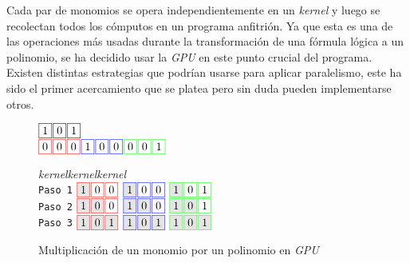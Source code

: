 Cada par de monomios se opera independientemente en un \textit{kernel} y luego se recolectan todos los cómputos en un programa anfitrión. Ya que esta es una de las operaciones más usadas durante la transformación de una fórmula lógica a un polinomio, se ha decidido usar la \textit{GPU} en este punto crucial del programa. Existen distintas estrategias que podrían usarse para aplicar paralelismo, este ha sido el primer acercamiento que se platea pero sin duda pueden implementarse otros.

\begin{figure}
    \centering
    \begin{minipage}[c][4.2cm][b]{.58\textwidth}
    \noindent
    $\fbox{1} \hspace*{.1em} \fbox{0} \hspace*{.1em} \fbox{1}$\\
    \noindent
    $\fcolorbox{red}{white}{0} \sep \fcolorbox{red}{white}{0} \sep \fcolorbox{red}{white}{0} \sep \fcolorbox{blue}{white}{1} \sep \fcolorbox{blue}{white}{0} \sep \fcolorbox{blue}{white}{0} \sep \fcolorbox{green}{white}{0} \sep \fcolorbox{green}{white}{0} \sep \fcolorbox{green}{white}{1}$\\

    \vspace{1em}

    \noindent\hspace{3.6em}\textit{kernel}\hspace{3.4em}\textit{kernel}\hspace{3.4em}\textit{kernel}\\
    \centering
    \texttt{Paso 1}
    $\fcolorbox{red}{gray!20}{1} \sep \fcolorbox{red}{white}{0} \sep \fcolorbox{red}{white}{0}$ \hspace{2em} $\fcolorbox{blue}{gray!20}{1} \sep \fcolorbox{blue}{white}{0} \sep \fcolorbox{blue}{white}{0}$ \hspace{2em} $\fcolorbox{green}{gray!20}{1} \sep \fcolorbox{green}{white}{0} \sep \fcolorbox{green}{white}{1}$\\

    \texttt{Paso 2}
    $\fcolorbox{red}{gray!20}{1} \sep \fcolorbox{red}{gray!20}{0} \sep \fcolorbox{red}{white}{0}$ \hspace{2em} $\fcolorbox{blue}{gray!20}{1} \sep \fcolorbox{blue}{gray!20}{0} \sep \fcolorbox{blue}{white}{0}$ \hspace{2em} $\fcolorbox{green}{gray!20}{1} \sep \fcolorbox{green}{gray!20}{0} \sep \fcolorbox{green}{white}{1}$\\

    \texttt{Paso 3}
    $\fcolorbox{red}{gray!20}{1} \sep \fcolorbox{red}{gray!20}{0} \sep \fcolorbox{red}{gray!20}{1}$ \hspace{2em} $\fcolorbox{blue}{gray!20}{1} \sep \fcolorbox{blue}{gray!20}{0} \sep \fcolorbox{blue}{gray!20}{1}$ \hspace{2em} $\fcolorbox{green}{gray!20}{1} \sep \fcolorbox{green}{gray!20}{0} \sep \fcolorbox{green}{gray!20}{1}$
    \end{minipage}
\caption{Multiplicación de un monomio por un polinomio en \textit{GPU}}
\label{fig:map_gpu_kernels}
\end{figure}

